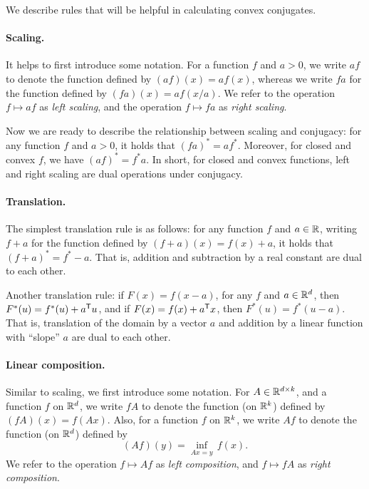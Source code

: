 We describe rules that will be helpful in calculating convex conjugates.  

\paragraph{Scaling.}

It helps to first introduce some notation. For a function $f$ and $a>0$, we
write $af$ to denote the function defined by $(af)(x) = af(x)$, whereas we write
$fa$ for the function defined by $(fa)(x) = af(x/a)$. We refer to the operation
$f \mapsto af$ as \emph{left scaling}, and the operation $f \mapsto fa$ as
\emph{right scaling}.

Now we are ready to describe the relationship between scaling and conjugacy: for
any function $f$ and $a>0$, it holds that $(fa)^* = af^*$. Moreover, for closed 
and convex $f$, we have $(af)^* = f^*a$. In short, for closed and convex
functions, left and right scaling are dual operations under conjugacy. 

\paragraph{Translation.}

The simplest translation rule is as follows: for any function $f$ and $a \in
\mathbb{R}$, writing $f+a$ for the function defined by $(f+a)(x) = f(x)+a$, it holds
that $(f+a)^* = f^*-a$. That is, addition and subtraction by a real constant are
dual to each other.

Another translation rule: if $F(x) = f(x-a)$, for any $f$ and $a \in \mathbb{R}^d$, then
$F^*(u) = f^*(u) + a^{\mathsf{T}} u$, and if $F(x) = f(x) + a^{\mathsf{T}} x$, then $F^*(u) =
f^*(u-a)$. That is, translation of the domain by a vector $a$ and addition by a
linear function with ``slope'' $a$ are dual to each other. 

\paragraph{Linear composition.}

Similar to scaling, we first introduce some notation. For $A \in \mathbb{R}^{d \times
  k}$, and a function $f$ on $\mathbb{R}^d$, we write $fA$ to denote the function (on
$\mathbb{R}^k$) defined by $(fA)(x) = f(Ax)$. Also, for a function $f$ on $\mathbb{R}^k$, we
write $Af$ to denote the function (on $\mathbb{R}^d$) defined by 
\[
(Af)(y) = \inf_{Ax=y} \, f(x).
\]
We refer to the operation $f \mapsto Af$ as \emph{left composition}, and $f
\mapsto fA$ as \emph{right composition}.


